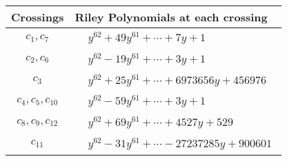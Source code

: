 \documentclass[1p]{elsarticle_modified}
\theoremstyle{definition}
\begin{document}
\begin{tabular}{m{50pt}|m{274pt}}
Crossings & \hspace{64pt}Riley Polynomials at each crossing \\
\hline $$\begin{aligned}c_{1},c_{7}\end{aligned}$$&$\begin{aligned}
&y^{62}+49 y^{61}+\cdots+7 y+1
\end{aligned}$\\
\hline $$\begin{aligned}c_{2},c_{6}\end{aligned}$$&$\begin{aligned}
&y^{62}-19 y^{61}+\cdots+3 y+1
\end{aligned}$\\
\hline $$\begin{aligned}c_{3}\end{aligned}$$&$\begin{aligned}
&y^{62}+25 y^{61}+\cdots+6973656 y+456976
\end{aligned}$\\
\hline $$\begin{aligned}c_{4},c_{5},c_{10}\end{aligned}$$&$\begin{aligned}
&y^{62}-59 y^{61}+\cdots+3 y+1
\end{aligned}$\\
\hline $$\begin{aligned}c_{8},c_{9},c_{12}\end{aligned}$$&$\begin{aligned}
&y^{62}+69 y^{61}+\cdots+4527 y+529
\end{aligned}$\\
\hline $$\begin{aligned}c_{11}\end{aligned}$$&$\begin{aligned}
&y^{62}-31 y^{61}+\cdots-27237285 y+900601
\end{aligned}$\\
\hline
\end{tabular}
\vskip 2pc
\end{document}

